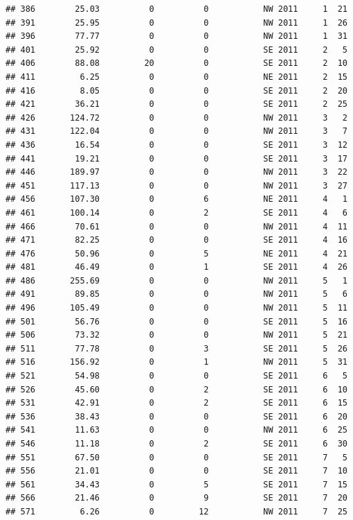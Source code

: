 \documentclass[
]{article}
\begin{document}
\begin{verbatim}
## 386        25.03          0          0           NW 2011     1  21
## 391        25.95          0          0           NW 2011     1  26
## 396        77.77          0          0           NW 2011     1  31
## 401        25.92          0          0           SE 2011     2   5
## 406        88.08         20          0           SE 2011     2  10
## 411         6.25          0          0           NE 2011     2  15
## 416         8.05          0          0           SE 2011     2  20
## 421        36.21          0          0           SE 2011     2  25
## 426       124.72          0          0           NW 2011     3   2
## 431       122.04          0          0           NW 2011     3   7
## 436        16.54          0          0           SE 2011     3  12
## 441        19.21          0          0           SE 2011     3  17
## 446       189.97          0          0           NW 2011     3  22
## 451       117.13          0          0           NW 2011     3  27
## 456       107.30          0          6           NE 2011     4   1
## 461       100.14          0          2           SE 2011     4   6
## 466        70.61          0          0           NW 2011     4  11
## 471        82.25          0          0           SE 2011     4  16
## 476        50.96          0          5           NE 2011     4  21
## 481        46.49          0          1           SE 2011     4  26
## 486       255.69          0          0           NW 2011     5   1
## 491        89.85          0          0           NW 2011     5   6
## 496       105.49          0          0           NW 2011     5  11
## 501        56.76          0          0           SE 2011     5  16
## 506        73.32          0          0           NW 2011     5  21
## 511        77.78          0          3           SE 2011     5  26
## 516       156.92          0          1           NW 2011     5  31
## 521        54.98          0          0           SE 2011     6   5
## 526        45.60          0          2           SE 2011     6  10
## 531        42.91          0          2           SE 2011     6  15
## 536        38.43          0          0           SE 2011     6  20
## 541        11.63          0          0           NW 2011     6  25
## 546        11.18          0          2           SE 2011     6  30
## 551        67.50          0          0           SE 2011     7   5
## 556        21.01          0          0           SE 2011     7  10
## 561        34.43          0          5           SE 2011     7  15
## 566        21.46          0          9           SE 2011     7  20
## 571         6.26          0         12           NW 2011     7  25

\end{verbatim}
\end{document}
